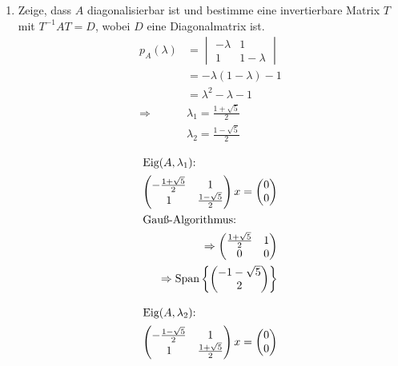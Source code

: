 \documentclass{HM}
\newcommand{\Eig}{\text{Eig}}
\newcommand{\Span}{\text{Span}}
\begin{document}
\begin{enumerate}
\begin{enumerate}
		\item Zeige, dass $A$ diagonalisierbar ist und bestimme eine invertierbare Matrix $T$ mit $T^{-1}AT=D$, wobei $D$ eine Diagonalmatrix ist.\\
		\begin{align*}
			p_A(\lambda)&=\begin{vmatrix}
				-\lambda&1\\
				1&1-\lambda
			\end{vmatrix}\\
			&=-\lambda(1-\lambda)-1\\
			&=\lambda^2-\lambda-1\\
			\Rightarrow &\lambda_1 = \frac{1+\sqrt{5}}{2}\\
			&\lambda_2 = \frac{1-\sqrt{5}}{2}
		\end{align*}
		\begin{minipage}{.5\textwidth}
			\begin{align*}
			\intertext{$\Eig(A, \lambda_1)$:}
			\begin{pmatrix}
				-\frac{1+\sqrt{5}}{2}&1\\
				1&\frac{1-\sqrt{5}}{2}
			\end{pmatrix}x=\begin{pmatrix}
				0\\0
			\end{pmatrix}\\
			\intertext{Gauß-Algorithmus:}
			\Rightarrow\begin{pmatrix}
				\frac{1+\sqrt{5}}{2}&1\\
				0&0
			\end{pmatrix}\\
			\Rightarrow\Span\left\lbrace\begin{pmatrix}
				-1-\sqrt{5}\\
				2
			\end{pmatrix}\right\rbrace
			\end{align*}
		\end{minipage}
		\begin{minipage}{.5\textwidth}
			\begin{align*}
			\intertext{$\Eig(A, \lambda_2)$:}
			\begin{pmatrix}
				-\frac{1-\sqrt{5}}{2}&1\\
				1&\frac{1+\sqrt{5}}{2}
			\end{pmatrix}x=\begin{pmatrix}
				0\\0
			\end{pmatrix}\\

\end{align*}
\end{minipage}
\end{enumerate}
\end{enumerate}
\end{document}

